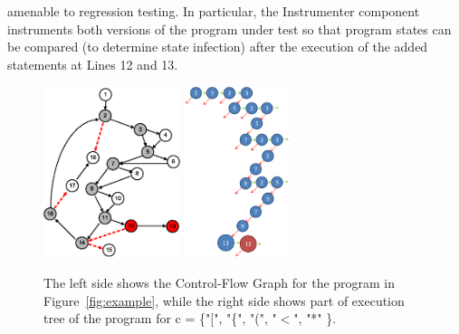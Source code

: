 amenable to regression testing. In particular, the Instrumenter component
instruments both versions of the program under test so that program states can be compared (to determine state infection) after the execution of the added  statements at Lines 12 and 13.
	\begin{figure}[t]
    \centering
        \includegraphics[width=4cm, keepaspectratio]{Figures/exampleCFG}
        \includegraphics[height=5cm, keepaspectratio]{Figures/Presentation2}
    \vspace{-0.1cm}
    \caption{\scriptsize{The left side shows the Control-Flow Graph for the program in Figure~\ref{fig:example}, while the right side shows part of execution tree of the program for c = \{"[", "\{", "(", "$<$", "*" \}.}}
    \vspace{-0.5cm}
    \label{fig:CFG}
    
\end{figure}
